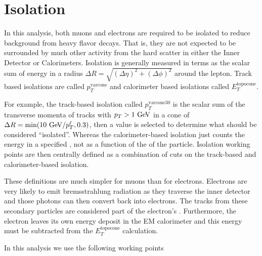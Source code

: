 \section{Isolation}

In this analysis, both muons and electrons are required to be isolated to reduce background from heavy flavor decays. That is, they are not expected to be surrounded by much other activity from the hard scatter in either the Inner Detector or Calorimeters. Isolation is generally measured in terms as the scalar sum of energy in a radius $\Delta R = \sqrt{(\Delta \eta)^2 + (\Delta \phi)^2}$ around the lepton. Track based isolations are called $p_{T}^{\textrm{varcone}}$ and calorimeter based isolations called $E_{T}^{\textrm{topocone}}$. 

For example, the track-based isolation called $p_{T}^{\textrm{varcone30}}$ is the scalar sum of the transverse momenta of tracks with $p_{T} > 1 \GeV$ in a cone of $\Delta R = \textrm{min}(10 \GeV/p_{T}^{\ell}, 0.3)$, then a value is selected to determine what should be considered ``isolated''. Whereas the calorimeter-based isolation just counts the energy in a specified \dR, not as a function of the \pt of the particle. Isolation working points are then centrally defined as a combination of cuts on the track-based and calorimeter-based isolation. 

These definitions are much simpler for muons than for electrons. Electrons are very likely to emit bremsstrahlung radiation as they traverse the inner detector and those photons can then convert back into electrons. The tracks from these secondary particles are considered part of the electron's \pT. Furthermore, the electron leaves its own energy deposit in the \ac{EM} calorimeter and this energy must be subtracted from the $E_{T}^{\textrm{topocone}}$ calculation.


In this analysis we use the following working points 



